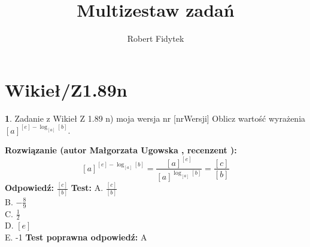 \documentclass[12pt, a4paper]{article}
\title{Multizestaw zadań}
\author{Robert Fidytek}
\date{}
\theoremstyle{definition} %
\newtheorem{zad}{}
\newcommand{\kategoria}[1]{\section{#1}} %
\newcommand{\zadStart}[1]{\begin{zad}#1\newline} %
\newcommand{\zadStop}{\end{zad}}   %
\newcommand{\rozwStart}[2]{\noindent \textbf{Rozwiązanie (autor #1 , recenzent #2): }\newline} %
\newcommand{\rozwStop}{\newline}                                            %
\newcommand{\odpStart}{\noindent \textbf{Odpowiedź:}\newline}    %
\newcommand{\odpStop}{\newline}                                             %
\newcommand{\testStart}{\noindent \textbf{Test:}\newline} %
\newcommand{\testStop}{\newline} %
\newcommand{\kluczStart}{\noindent \textbf{Test poprawna odpowiedź:}\newline} %
\newcommand{\kluczStop}{\newline} %
\begin{document}
\maketitle


\kategoria{Wikieł/Z1.89n}
\zadStart{Zadanie z Wikieł Z 1.89 n) moja wersja nr [nrWersji]}
Oblicz warto\'sć wyrażenia $[a]^{[e]-\log_{[a]}{[b]}}$.
\zadStop
\rozwStart{Małgorzata Ugowska}{}
$$[a]^{[e]-\log_{[a]}{[b]}}= \frac{[a]^{[e]}}{[a]^{\log_{[a]}{[b]}}}=   \frac{[c]}{[b]} $$
\rozwStop
\odpStart
$\frac{[c]}{[b]}$
\odpStop
\testStart
A. $\frac{[c]}{[b]}$\\
B. $-\frac{8}{9}$\\
C. $\frac{1}{2}$\\
D. $[e]$\\
E. -1
\testStop
\kluczStart
A
\kluczStop
\end{document}
